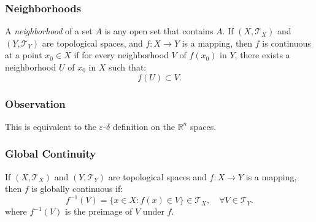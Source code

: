 \documentclass[11pt]{article}
\begin{document}
\begin{center}
\end{center}

\subsubsection{Neighborhoods}
A \textit{neighborhood} of a set $A$ is any open set that contains $A$. If $(X, \mathcal{T}_X)$ and $(Y, \mathcal{T}_Y)$ are topological spaces, and $f: X \to Y$ is a mapping, then $f$ is continuous at a point $x_0 \in X$ if for every neighborhood $V$ of $f(x_0)$ in $Y$, there exists a neighborhood $U$ of $x_0$ in $X$ such that:
\[f(U) \subset V.\]

\subsubsection*{Observation}
This is equivalent to the $\varepsilon$-$\delta$ definition on the $\mathbb{R}^n$ spaces.

\subsubsection{Global Continuity}
If $(X, \mathcal{T}_X)$ and $(Y, \mathcal{T}_Y)$ are topological spaces and $f: X \to Y$ is a mapping, then $f$ is globally continuous if:
\[f^{-1}(V) = \{x \in X : f(x) \in V\} \in \mathcal{T}_X, \quad \forall V \in \mathcal{T}_Y.\]
where $f^{-1}(V)$ is the preimage of $V$ under $f$.
\end{document}
